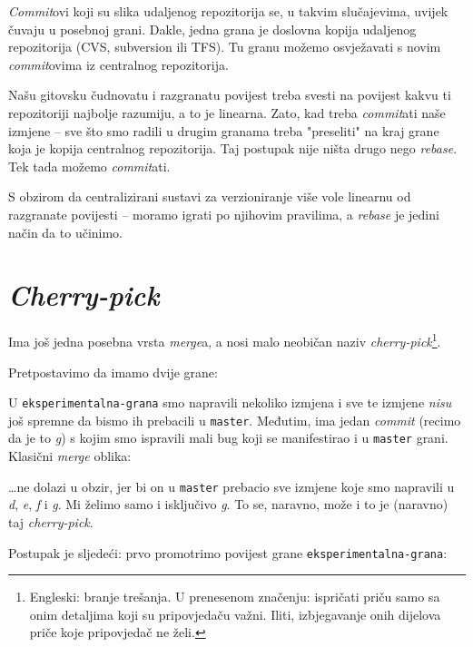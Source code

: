 \emph{Commit}ovi koji su slika udaljenog repozitorija se, u takvim slučajevima, uvijek čuvaju u posebnoj grani.
Dakle, jedna grana je doslovna kopija udaljenog repozitorija (CVS, subversion ili TFS).
Tu granu možemo osvježavati s novim \emph{commit}ovima iz centralnog repozitorija.

Našu gitovsku čudnovatu i razgranatu povijest treba svesti na povijest kakvu ti repozitoriji najbolje razumiju, a to je linearna.
Zato, kad treba \emph{commit}ati naše izmjene -- sve što smo radili u drugim granama treba "preseliti" na kraj grane koja je kopija centralnog repozitorija.
Taj postupak nije ništa drugo nego \emph{rebase}.
Tek tada možemo \emph{commit}ati.

S obzirom da centralizirani sustavi za verzioniranje više vole linearnu od razgranate povijesti -- moramo igrati po njihovim pravilima, a \emph{rebase} je jedini način da to učinimo.

\section*{\emph{Cherry-pick}}

Ima još jedna posebna vrsta \emph{merge}a, a nosi malo neobičan naziv \emph{cherry-pick}\footnote{Engleski: branje trešanja. U prenesenom značenju: ispričati priču samo sa onim detaljima koji su pripovjedaču važni. Iliti, izbjegavanje onih dijelova priče koje pripovjedač ne želi.}.

Pretpostavimo da imamo dvije grane:



U \verb+eksperimentalna-grana+ smo napravili nekoliko izmjena i sve te izmjene \emph{nisu} još spremne da bismo ih prebacili u \verb+master+.
Međutim, ima jedan \emph{commit} (recimo da je to \emph g) s kojim smo ispravili mali bug koji se manifestirao i u \verb+master+ grani.
Klasični \emph{merge} oblika:



\dots{}ne dolazi u obzir, jer bi on u \verb+master+ prebacio sve izmjene koje smo napravili u \emph d, \emph e, \emph f i \emph g.
Mi želimo samo i isključivo \emph g.
To se, naravno, može i to je (naravno) taj \emph{cherry-pick}.

Postupak je sljedeći: prvo promotrimo povijest grane \verb+eksperimentalna-grana+:



